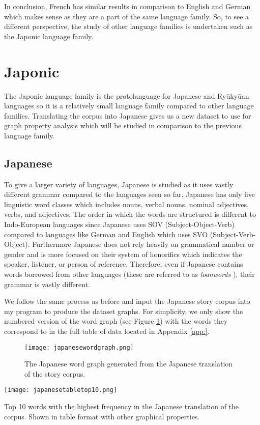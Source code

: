 In conclusion, French has similar results in comparison to English and German which makes sense as they are a part of the same language family. So, to see a different perspective, the study of other language families is undertaken such as the Japonic language family.

\section{Japonic}
The Japonic language family is the protolanguage for Japanese and Ryūkyūan languages \cite{vovin2017origins} so it is a relatively small language family compared to other language families. Translating the corpus into Japanese gives us a new dataset to use for graph property analysis which will be studied in comparison to the previous language family.
\subsection{Japanese}
To give a larger variety of languages, Japanese is studied as it uses vastly different grammar compared to the languages seen so far. Japanese has only five linguistic word classes which includes nouns, verbal nouns, nominal adjectives, verbs, and adjectives. The order in which the words are structured is different to Indo-European languages since Japanese uses SOV (Subject-Object-Verb) compared to languages like German and English which uses SVO (Subject-Verb-Object). Furthermore Japanese does not rely heavily on grammatical number or gender and is more focused on their system of honorifics which indicates the speaker, listener, or person of reference. Therefore, even if Japanese contains words borrowed from other languages (these are referred to as \emph{loanwords} \cite{miura1979influence}), their grammar is vastly different. 

We follow the same process as before and input the Japanese story corpus into my program to produce the dataset graphs. For simplicity, we only show the numbered version of the word graph (see Figure \ref{fig:jpgraph}) with the words they correspond to in the full table of data located in Appendix \ref{app:}.

\begin{figure}[!htb]
\centering
\texttt{[image: japanesewordgraph.png]}
\caption{The Japanese word graph generated from the Japanese translation of the story corpus.}
\label{fig:jpgraph}
\end{figure}

\begin{table}[!htb]
\centering
\texttt{[image: japanesetabletop10.png]}
\caption{Top 10 words with the highest frequency in the Japanese translation of the corpus. Shown in table format with other graphical properties. }
\label{table:japanesetop}
\end{table}

